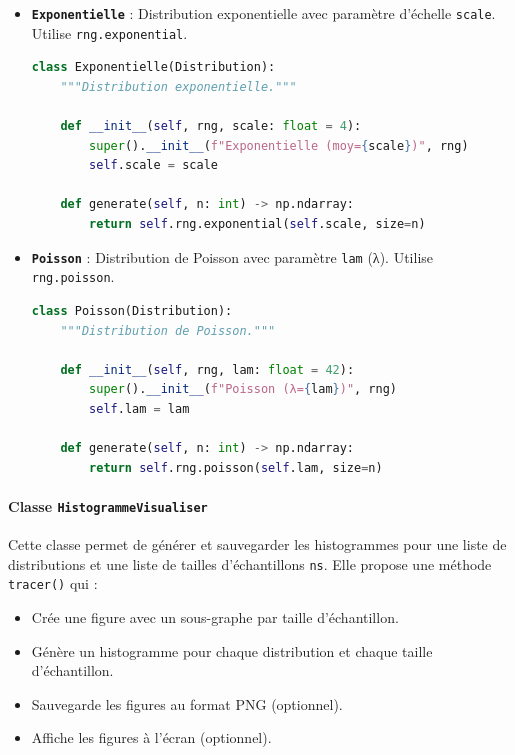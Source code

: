 \documentclass{article}
\begin{document}
\begin{itemize}
\begin{lstlisting}[language=Python, caption=Implémentation de la classe Normale]
    def __init__(self, rng, mu: float = 0, sigma: float = 0.5):
        super().__init__(f"Normale (µ={mu}, σ={sigma})", rng)
        self.mu = mu
        self.sigma = sigma

    def generate(self, n: int) -> np.ndarray:
        return self.rng.normal(self.mu, self.sigma, size=n)
    \end{lstlisting}

    \item \textbf{\texttt{Exponentielle}} : Distribution exponentielle avec paramètre d'échelle \texttt{scale}. Utilise \texttt{rng.exponential}.
    \begin{lstlisting}[language=Python, caption=Implémentation de la classe Exponentielle]
class Exponentielle(Distribution):
    """Distribution exponentielle."""

    def __init__(self, rng, scale: float = 4):
        super().__init__(f"Exponentielle (moy={scale})", rng)
        self.scale = scale

    def generate(self, n: int) -> np.ndarray:
        return self.rng.exponential(self.scale, size=n)
    \end{lstlisting}

    \item \textbf{\texttt{Poisson}} : Distribution de Poisson avec paramètre \texttt{lam} (λ). Utilise \texttt{rng.poisson}.
    \begin{lstlisting}[language=Python, caption=Implémentation de la classe Poisson]
class Poisson(Distribution):
    """Distribution de Poisson."""

    def __init__(self, rng, lam: float = 42):
        super().__init__(f"Poisson (λ={lam})", rng)
        self.lam = lam

    def generate(self, n: int) -> np.ndarray:
        return self.rng.poisson(self.lam, size=n)
    \end{lstlisting}
\end{itemize}

\paragraph{Classe \texttt{HistogrammeVisualiser}}
Cette classe permet de générer et sauvegarder les histogrammes pour une liste de distributions et une liste de tailles d'échantillons \texttt{ns}. Elle propose une méthode \texttt{tracer()} qui :
\begin{itemize}
    \item Crée une figure avec un sous-graphe par taille d'échantillon.
    \item Génère un histogramme pour chaque distribution et chaque taille d'échantillon.
    \item Sauvegarde les figures au format PNG (optionnel).
    \item Affiche les figures à l'écran (optionnel).
\end{itemize}
\end{document}
